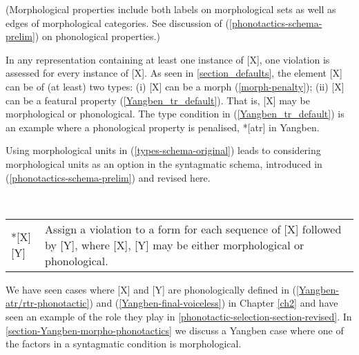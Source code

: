 (Morphological properties include both labels on morphological sets as well as edges of morphological categories. See discussion of (\ref{phonotactics-schema-prelim}) on phonological properties.)

In any representation containing at least one instance of [X], one violation is assessed for every instance of [X]. As seen in \textsection\ref{section_defaults}, the element [X] can be of (at least) two types: (i) [X] can be a morph (\ref{morph-penalty}); (ii) [X] can be a featural property (\ref{Yangben_tr_default}). That is, [X] may be morphological or phonological. The type condition in (\ref{Yangben_tr_default}) is an example where a phonological property is penalised, *[atr] in Yangben. 

Using morphological units in (\ref{types-schema-original}) leads to considering morphological units as an option in the syntagmatic schema, introduced in (\ref{phonotactics-schema-prelim}) and revised here.

\begin{example}  \label{phonotactics-schema-original}\smallskip\\
    \begin{tabularx}{\linewidth}{@{}lQ@{}}
        *[X][Y] & Assign a violation to a form for each  sequence of [X] followed by [Y], where [X], [Y] may be either morphological or phonological.\\
    \end{tabularx}
\end{example}

We have seen cases where [X] and [Y] are phonologically defined in (\ref{Yangben-atr/rtr-phonotactic})  and (\ref{Yangben-final-voiceless}) in Chapter \ref{ch2} and have seen an example of the role they play in \textsection\ref{phonotactic-selection-section-revised}. In \textsection\ref{section-Yangben-morpho-phonotactics} we  discuss a Yangben case where one of the factors in a syntagmatic condition is morphological.

